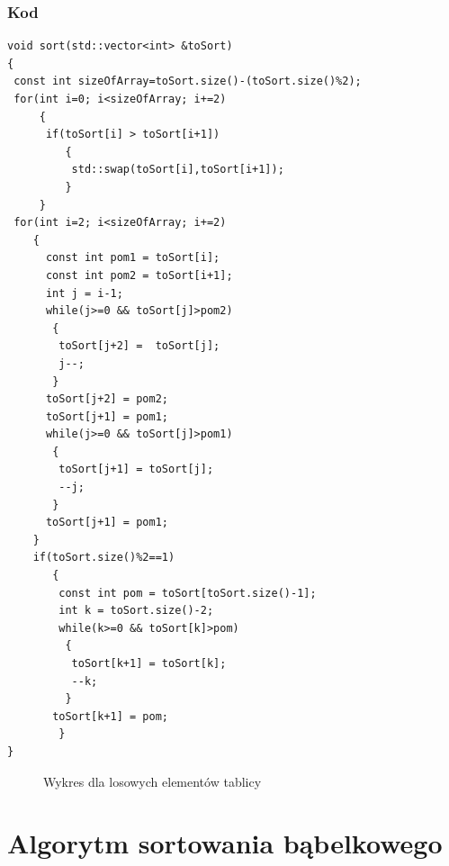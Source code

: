 \subsubsection*{Kod}
\begin{lstlisting}
void sort(std::vector<int> &toSort)
{
 const int sizeOfArray=toSort.size()-(toSort.size()%2);
 for(int i=0; i<sizeOfArray; i+=2)
     {
      if(toSort[i] > toSort[i+1])
         {
          std::swap(toSort[i],toSort[i+1]);
         }
     }
 for(int i=2; i<sizeOfArray; i+=2)
    {
      const int pom1 = toSort[i];
      const int pom2 = toSort[i+1];
      int j = i-1;
	  while(j>=0 && toSort[j]>pom2)
	   {
	    toSort[j+2] =  toSort[j];
	    j--;
	   }
	  toSort[j+2] = pom2;
	  toSort[j+1] = pom1;
	  while(j>=0 && toSort[j]>pom1)
	   {
	    toSort[j+1] = toSort[j];
	    --j;
	   }
	  toSort[j+1] = pom1;
	}
	if(toSort.size()%2==1)
	   {
	    const int pom = toSort[toSort.size()-1];
	    int k = toSort.size()-2;
	    while(k>=0 && toSort[k]>pom)
	     {
	      toSort[k+1] = toSort[k];
	      --k;
		 }
	   toSort[k+1] = pom;
	    }
}
\end{lstlisting}
\begin{figure}[h!]
  \begin{center}
    \caption{Wykres dla losowych elementów tablicy}
  \end{center}
\end{figure}
\FloatBarrier

\section{Algorytm sortowania bąbelkowego}
